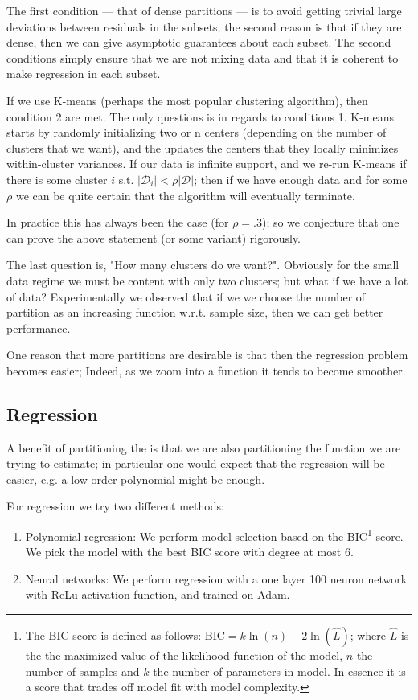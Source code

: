 The first condition ---  that of dense partitions ---  is to avoid getting trivial large deviations between residuals 
in the subsets; the second reason is that if they are dense, then we can give asymptotic guarantees about each subset.
The second conditions simply ensure that we are not mixing data and that it is coherent to make regression
in each subset. 

If we use K-means (perhaps the most popular clustering algorithm), then condition 2 are met. The only 
questions is in regards to conditions 1. K-means starts by randomly initializing two or n centers (depending 
on the number of clusters that we want), and the updates the centers that they locally 
minimizes within-cluster variances. If our data is infinite support, and we re-run K-means if there is some cluster
$i$ s.t. $|\mathcal{D}_i| < \rho |\mathcal{D}|$; then if we have enough data and for some $\rho$ we can be quite 
certain that the algorithm will eventually terminate. 

In practice this has always been the case (for $\rho = .3$); so we conjecture that one can prove the above statement 
(or some variant) rigorously. 

The last question is, "How many clusters do we want?". Obviously for the small data regime we must be content 
with only two clusters; but what if we have a lot of data? Experimentally we observed that if we 
we choose the number of partition as an increasing function w.r.t. sample size, then we can get better performance.

One reason that more partitions are desirable is that then the regression problem becomes easier; Indeed, as we 
zoom into a function it tends to become smoother.


\subsection{Regression}

A benefit of partitioning the is that we are also partitioning the function we are trying to estimate; in 
particular one would expect that the regression will be easier, e.g. a low order polynomial might be enough.

For regression we try two different methods:

\begin{enumerate}
    \item Polynomial regression: We perform model selection based on the BIC\footnote{
    The BIC score is defined as follows: $\mathrm{BIC} =k\ln(n)-2\ln({\widehat{L}})$; where $\widehat{L}$
    is the the maximized value of the likelihood function of the model, $n$ the number of samples and 
    $k$ the number of parameters in model. In essence it is a score that 
    trades off model fit with model complexity. } score. We pick the model with the 
    best BIC score with degree at most 6. 
    \item Neural networks: We perform regression with a one layer 100 neuron network with ReLu activation
    function, and trained on Adam.
\end{enumerate}

